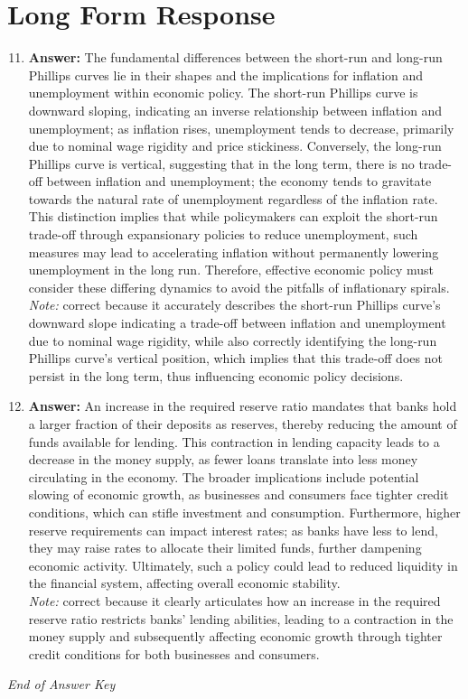 \documentclass[12pt]{article}
\begin{document}
\section*{Long Form Response}
\begin{enumerate}[label=\arabic*.]
\setcounter{enumi}{10}
\item \textbf{Answer:} The fundamental differences between the short-run and long-run Phillips curves lie in their shapes and the implications for inflation and unemployment within economic policy. The short-run Phillips curve is downward sloping, indicating an inverse relationship between inflation and unemployment; as inflation rises, unemployment tends to decrease, primarily due to nominal wage rigidity and price stickiness. Conversely, the long-run Phillips curve is vertical, suggesting that in the long term, there is no trade-off between inflation and unemployment; the economy tends to gravitate towards the natural rate of unemployment regardless of the inflation rate. This distinction implies that while policymakers can exploit the short-run trade-off through expansionary policies to reduce unemployment, such measures may lead to accelerating inflation without permanently lowering unemployment in the long run. Therefore, effective economic policy must consider these differing dynamics to avoid the pitfalls of inflationary spirals.
\\ \textit{Note:} correct because it accurately describes the short-run Phillips curve's downward slope indicating a trade-off between inflation and unemployment due to nominal wage rigidity, while also correctly identifying the long-run Phillips curve's vertical position, which implies that this trade-off does not persist in the long term, thus influencing economic policy decisions.
\item \textbf{Answer:} An increase in the required reserve ratio mandates that banks hold a larger fraction of their deposits as reserves, thereby reducing the amount of funds available for lending. This contraction in lending capacity leads to a decrease in the money supply, as fewer loans translate into less money circulating in the economy. The broader implications include potential slowing of economic growth, as businesses and consumers face tighter credit conditions, which can stifle investment and consumption. Furthermore, higher reserve requirements can impact interest rates; as banks have less to lend, they may raise rates to allocate their limited funds, further dampening economic activity. Ultimately, such a policy could lead to reduced liquidity in the financial system, affecting overall economic stability.
\\ \textit{Note:} correct because it clearly articulates how an increase in the required reserve ratio restricts banks' lending abilities, leading to a contraction in the money supply and subsequently affecting economic growth through tighter credit conditions for both businesses and consumers.
\end{enumerate}

\vfill
\noindent\textit{End of Answer Key}
\end{document}
